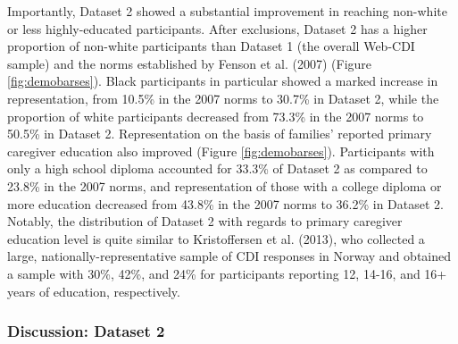 \documentclass[
  english,
  ,man,floatsintext]{apa6}
\begin{document}
Importantly, Dataset 2 showed a substantial improvement in reaching non-white or less highly-educated participants. After exclusions, Dataset 2 has a higher proportion of non-white participants than Dataset 1 (the overall Web-CDI sample) and the norms established by Fenson et al. (2007) (Figure \ref{fig:demobarses}). Black participants in particular showed a marked increase in representation, from 10.5\% in the 2007 norms to 30.7\% in Dataset 2, while the proportion of white participants decreased from 73.3\% in the 2007 norms to 50.5\% in Dataset 2. Representation on the basis of families' reported primary caregiver education also improved (Figure \ref{fig:demobarses}). Participants with only a high school diploma accounted for 33.3\% of Dataset 2 as compared to 23.8\% in the 2007 norms, and representation of those with a college diploma or more education decreased from 43.8\% in the 2007 norms to 36.2\% in Dataset 2. Notably, the distribution of Dataset 2 with regards to primary caregiver education level is quite similar to Kristoffersen et al. (2013), who collected a large, nationally-representative sample of CDI responses in Norway and obtained a sample with 30\%, 42\%, and 24\% for participants reporting 12, 14-16, and 16+ years of education, respectively.

\hypertarget{discussion-dataset-2}{%
\subsubsection{Discussion: Dataset 2}\label{discussion-dataset-2}}
\end{document}
